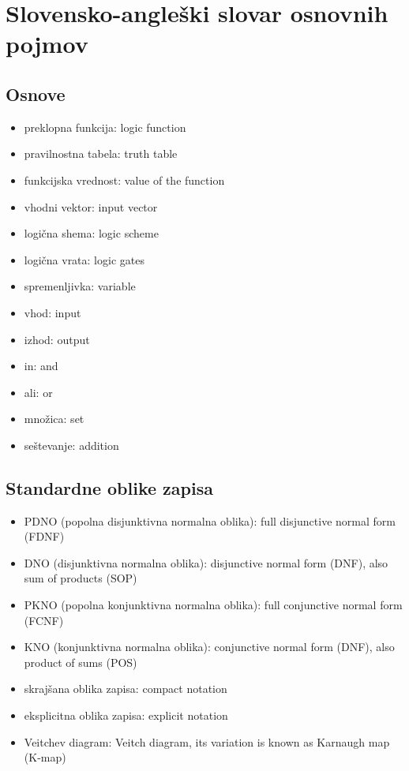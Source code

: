 \chapter{Slovensko-angleški slovar osnovnih pojmov}

\section*{Osnove}

\begin{itemize}
\item preklopna funkcija: logic function
\item pravilnostna tabela: truth table
\item funkcijska vrednost: value of the function
\item vhodni vektor: input vector
\item logična shema: logic scheme
\item logična vrata: logic gates
\item spremenljivka: variable
\item vhod: input
\item izhod: output
\item in: and
\item ali: or
\item množica: set
\item seštevanje: addition
\end{itemize}

\section*{Standardne oblike zapisa}

\begin{itemize}
\item PDNO (popolna disjunktivna normalna oblika): full disjunctive normal form (FDNF)
\item DNO (disjunktivna normalna oblika): disjunctive normal form (DNF), also sum of products (SOP)
\item PKNO (popolna konjunktivna normalna oblika): full conjunctive normal form (FCNF)
\item KNO (konjunktivna normalna oblika): conjunctive  normal form (DNF), also product of sums (POS)
\item skrajšana oblika zapisa: compact notation
\item eksplicitna oblika zapisa: explicit notation
\item Veitchev diagram: Veitch diagram, its variation is known as Karnaugh map (K-map)
\end{itemize}

